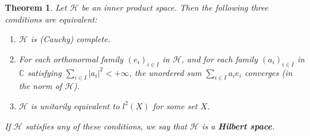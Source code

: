 \documentclass[12pt,b5paper,notitlepage]{article}
\theoremstyle{definition}
\theoremstyle{plain}
\newtheorem{thm}[df]{Theorem}
\newcommand{\Cbb}{\mathbb C}
\newcommand{\MH}{\mathcal H}
\numberwithin{equation}{section}
\begin{document}
\begin{thm}\label{lb129}
Let $\MH$ be an inner product space. Then the following three conditions are equivalent:
\begin{enumerate}[label=(\alph*)]
\item $\MH$ is (Cauchy) complete.
\item For each orthonormal family $(e_i)_{i\in I}$ in $\MH$, and for each family $(a_i)_{i\in I}$ in $\Cbb$ satisfying $\sum_{i\in I}|a_i|^2<+\infty$, the unordered sum $\sum_{i\in I}a_ie_i$ converges (in the norm of $\MH$).
\item $\MH$ is unitarily equivalent to $l^2(X)$ for some set $X$.
\end{enumerate} 
If $\MH$ satisfies any of these conditions, we say that $\MH$ is a \textbf{Hilbert space}.
\end{thm}
\end{document}
